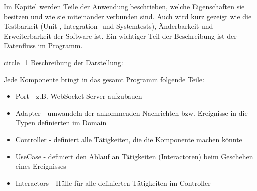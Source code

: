 Im Kapitel werden Teile der Anwendung beschrieben, welche Eigenschaften sie besitzen und wie sie miteinander verbunden sind.
Auch wird kurz gezeigt wie die Testbarkeit (Unit-, Integration- und Systemtests), 
Änderbarkeit und Erweiterbarkeit der Software ist.    
Ein wichtiger Teil der Beschreibung ist der Datenfluss im Programm.

{circle_1}
Beschreibung der Darstellung:

Jede Komponente bringt in das gesamt Programm folgende Teile:
\begin{itemize}
    \item Port - z.B. WebSocket Server aufzubauen
    \item Adapter  - umwandeln der ankommenden Nachrichten bzw. Ereignisse in die Typen definierten im Domain
    \item Controller - definiert alle Tätigkeiten, die die Komponente machen könnte
    \item UseCase - definiert den Ablauf an Tätigkeiten (Interactoren) beim Geschehen eines Ereignisses
    \item Interactors - Hülle für alle definierten Tätigkeiten im Controller
\end{itemize}
